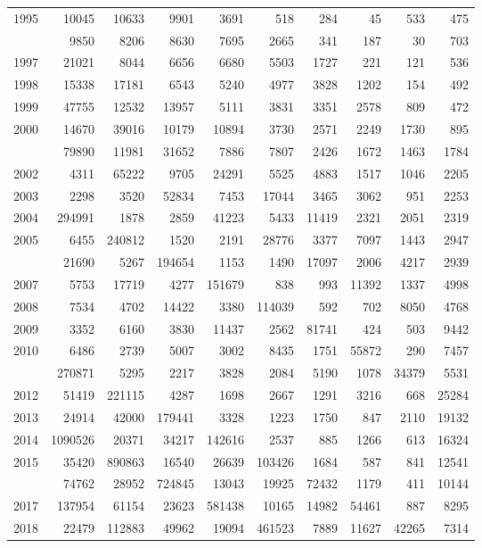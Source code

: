 \documentclass[
]{article}
\begin{document}
\begin{longtable}[t]{lrrrrrrrrr}
1995 & 10045 & 10633 & 9901 & 3691 & 518 & 284 & 45 & 533 & 475\\
\addlinespace
1996 & 9850 & 8206 & 8630 & 7695 & 2665 & 341 & 187 & 30 & 703\\
1997 & 21021 & 8044 & 6656 & 6680 & 5503 & 1727 & 221 & 121 & 536\\
1998 & 15338 & 17181 & 6543 & 5240 & 4977 & 3828 & 1202 & 154 & 492\\
1999 & 47755 & 12532 & 13957 & 5111 & 3831 & 3351 & 2578 & 809 & 472\\
2000 & 14670 & 39016 & 10179 & 10894 & 3730 & 2571 & 2249 & 1730 & 895\\
\addlinespace
2001 & 79890 & 11981 & 31652 & 7886 & 7807 & 2426 & 1672 & 1463 & 1784\\
2002 & 4311 & 65222 & 9705 & 24291 & 5525 & 4883 & 1517 & 1046 & 2205\\
2003 & 2298 & 3520 & 52834 & 7453 & 17044 & 3465 & 3062 & 951 & 2253\\
2004 & 294991 & 1878 & 2859 & 41223 & 5433 & 11419 & 2321 & 2051 & 2319\\
2005 & 6455 & 240812 & 1520 & 2191 & 28776 & 3377 & 7097 & 1443 & 2947\\
\addlinespace
2006 & 21690 & 5267 & 194654 & 1153 & 1490 & 17097 & 2006 & 4217 & 2939\\
2007 & 5753 & 17719 & 4277 & 151679 & 838 & 993 & 11392 & 1337 & 4998\\
2008 & 7534 & 4702 & 14422 & 3380 & 114039 & 592 & 702 & 8050 & 4768\\
2009 & 3352 & 6160 & 3830 & 11437 & 2562 & 81741 & 424 & 503 & 9442\\
2010 & 6486 & 2739 & 5007 & 3002 & 8435 & 1751 & 55872 & 290 & 7457\\
\addlinespace
2011 & 270871 & 5295 & 2217 & 3828 & 2084 & 5190 & 1078 & 34379 & 5531\\
2012 & 51419 & 221115 & 4287 & 1698 & 2667 & 1291 & 3216 & 668 & 25284\\
2013 & 24914 & 42000 & 179441 & 3328 & 1223 & 1750 & 847 & 2110 & 19132\\
2014 & 1090526 & 20371 & 34217 & 142616 & 2537 & 885 & 1266 & 613 & 16324\\
2015 & 35420 & 890863 & 16540 & 26639 & 103426 & 1684 & 587 & 841 & 12541\\
\addlinespace
2016 & 74762 & 28952 & 724845 & 13043 & 19925 & 72432 & 1179 & 411 & 10144\\
2017 & 137954 & 61154 & 23623 & 581438 & 10165 & 14982 & 54461 & 887 & 8295\\
2018 & 22479 & 112883 & 49962 & 19094 & 461523 & 7889 & 11627 & 42265 & 7314\\*
\end{longtable}
\end{document}
